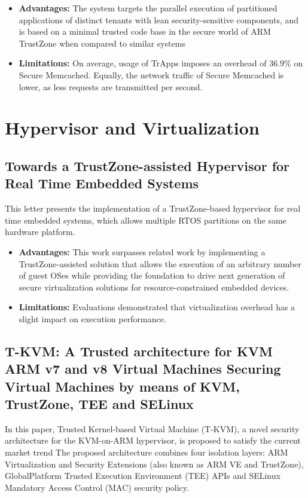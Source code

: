 \documentclass[conference]{IEEEtran}
\begin{document}
\begin{itemize}
    \item \textbf{Advantages:} The system targets the parallel execution of partitioned applications of distinct tenants with lean security-sensitive components, and is based on a minimal trusted code base in the secure world of ARM TrustZone when compared to similar systems
    \item \textbf{Limitations:} On average, usage of TrApps imposes an overhead of $36.9\%$ on Secure Memcached. Equally, the network traffic of Secure Memcached is lower, as less requests are transmitted per second.
\end{itemize}

\section{Hypervisor and Virtualization}

\subsection{Towards a TrustZone-assisted Hypervisor for Real Time Embedded Systems}
This letter presents the implementation of a TrustZone-based hypervisor for real time embedded systems, which allows multiple RTOS partitions on the same hardware platform.

\begin{itemize}
    \item \textbf{Advantages:} This work surpasses related work by implementing a TrustZone-assisted solution that allows the execution of an arbitrary number of guest OSes while providing the foundation to drive next generation of secure virtualization solutions for resource-constrained embedded devices.
    \item \textbf{Limitations:} Evaluations demonstrated that virtualization overhead has a slight impact on execution performance.
\end{itemize}

\subsection{T-KVM: A Trusted architecture for KVM ARM v7 and v8 Virtual Machines Securing Virtual Machines by means of KVM, TrustZone, TEE and SELinux}
In this paper, Trusted Kernel-based Virtual Machine (T-KVM), a novel security architecture for the KVM-on-ARM hypervisor, is proposed to satisfy the current market trend The proposed architecture combines four isolation layers: ARM Virtualization and Security Extensions (also known as ARM VE and TrustZone), GlobalPlatform Trusted Execution Environment (TEE) APIs and SELinux Mandatory Access Control (MAC) security policy.
\end{document}
